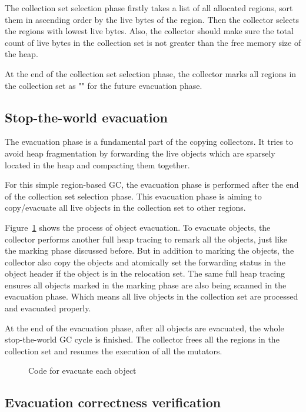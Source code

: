 The collection set selection phase firstly takes a list of all allocated regions,
sort them in ascending order by the live bytes of the region.
Then the collector selects the regions with lowest live bytes.
Also, the collector should make sure the total count of live bytes in the collection set is not
greater than the free memory size of the heap.

At the end of the collection set selection phase, the collector marks all regions
in the collection set as "" for the future evacuation phase.

\subsection{Stop-the-world evacuation}

The evacuation phase is a fundamental part of the copying collectors.
It tries to avoid heap fragmentation by forwarding the live objects which are sparsely located in the heap
and compacting them together.

For this simple region-based GC, the evacuation phase is performed after the end of the collection set selection phase.
This evacuation phase is aiming to copy/evacuate all live objects in the collection set to other
regions.

Figure~\ref{fig:traceevacuateobject} shows the process of object evacuation.
To evacuate objects, the collector performs another full heap tracing to remark all the objects,
just like the marking phase discussed before.
But in addition to marking the objects, the collector also copy the objects and atomically set the forwarding status in the object header
if the object is in the relocation set.
The same full heap tracing ensures all objects marked in the marking phase are also being scanned in the evacuation phase.
Which means all live objects in the collection set are processed and evacuated properly.

At the end of the evacuation phase, after all objects are evacuated, the whole stop-the-world GC cycle is finished.
The collector frees all the regions in the collection set and resumes the execution of all the mutators.

\begin{figure}
  \centering
  
  \caption{Code for evacuate each object}
  \label{fig:traceevacuateobject}
\end{figure}

\subsection{Evacuation correctness verification}

